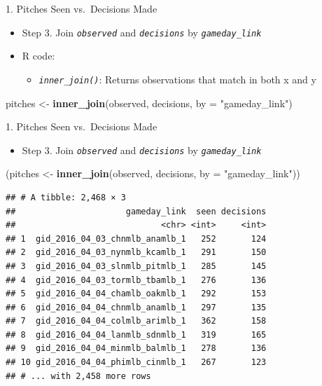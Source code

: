 \documentclass[14pt,ignorenonframetext,aspectratio = 1610]{beamer}
\newenvironment{Shaded}{\begin{snugshade}}{\end{snugshade}}
\newcommand{\KeywordTok}[1]{\textcolor[rgb]{0.13,0.29,0.53}{\textbf{{#1}}}}
\newcommand{\DataTypeTok}[1]{\textcolor[rgb]{0.13,0.29,0.53}{{#1}}}
\newcommand{\StringTok}[1]{\textcolor[rgb]{0.31,0.60,0.02}{{#1}}}
\newcommand{\NormalTok}[1]{{#1}}
\providecommand{\tightlist}{%
\setlength{\itemsep}{0pt}\setlength{\parskip}{0pt}}
\begin{document}
\begin{frame}[fragile]{1. Pitches Seen vs.~Decisions Made}

\begin{itemize}
\tightlist
\item
  Step 3. Join \emph{\texttt{observed}} and \emph{\texttt{decisions}} by
  \emph{\texttt{gameday\_link}}
\item
  R code:

  \begin{itemize}
  \tightlist
  \item
    \emph{\texttt{inner\_join()}}: Returns observations that match in
    both x and y
  \end{itemize}
\end{itemize}

\footnotesize

\begin{Shaded}
\begin{Highlighting}[]
\NormalTok{pitches <-}\StringTok{ }\KeywordTok{inner_join}\NormalTok{(observed, decisions, }\DataTypeTok{by =} \StringTok{"gameday_link"}\NormalTok{)}
\end{Highlighting}
\end{Shaded}

\end{frame}

\begin{frame}[fragile]{1. Pitches Seen vs.~Decisions Made}

\begin{itemize}
\tightlist
\item
  Step 3. Join \emph{\texttt{observed}} and \emph{\texttt{decisions}} by
  \emph{\texttt{gameday\_link}}
\end{itemize}

\footnotesize

\begin{Shaded}
\begin{Highlighting}[]
\NormalTok{(pitches <-}\StringTok{ }\KeywordTok{inner_join}\NormalTok{(observed, decisions, }\DataTypeTok{by =} \StringTok{"gameday_link"}\NormalTok{))}
\end{Highlighting}
\end{Shaded}

\begin{verbatim}
## # A tibble: 2,468 × 3
##                      gameday_link  seen decisions
##                             <chr> <int>     <int>
## 1  gid_2016_04_03_chnmlb_anamlb_1   252       124
## 2  gid_2016_04_03_nynmlb_kcamlb_1   291       150
## 3  gid_2016_04_03_slnmlb_pitmlb_1   285       145
## 4  gid_2016_04_03_tormlb_tbamlb_1   276       136
## 5  gid_2016_04_04_chamlb_oakmlb_1   292       153
## 6  gid_2016_04_04_chnmlb_anamlb_1   297       135
## 7  gid_2016_04_04_colmlb_arimlb_1   362       158
## 8  gid_2016_04_04_lanmlb_sdnmlb_1   319       165
## 9  gid_2016_04_04_minmlb_balmlb_1   278       136
## 10 gid_2016_04_04_phimlb_cinmlb_1   267       123
## # ... with 2,458 more rows
\end{verbatim}

\end{frame}
\end{document}
